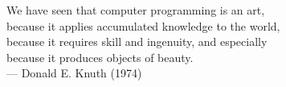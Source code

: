 
\clearpage

\vspace*{5cm}

\begin{center}
   
    We have seen that computer programming is an art, \\ 
    because it applies accumulated knowledge to the world, \\ 
    because it requires skill and ingenuity, and especially \\
    because it produces objects of beauty.\\
    
    \medskip
    --- Donald E. Knuth (1974)




\end{center}

